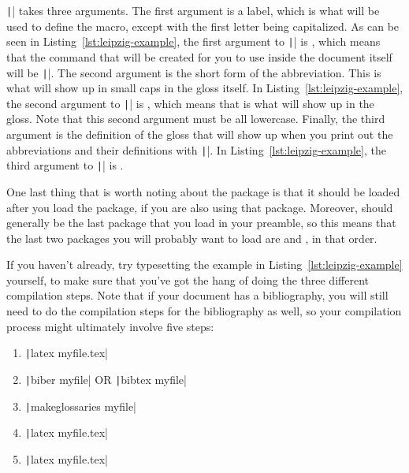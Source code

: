 \texttt|\newleipzig| takes three arguments.
The first argument is a label, which is what will be used to define the macro, except with the first letter being capitalized.
As can be seen in Listing~\ref{lst:leipzig-example}, the first argument to \texttt|\newleipzig| is , which means that the command that will be created for you to use inside the document itself will be \texttt|\Pol{}|.
The second argument is the short form of the abbreviation.
This is what will show up in small caps in the gloss itself.
In Listing~\ref{lst:leipzig-example}, the second argument to \texttt|\newleipzig| is , which means that \Pol{} is what will show up in the gloss.
Note that this second argument must be all lowercase.
Finally, the third argument is the definition of the gloss that will show up when you print out the abbreviations and their definitions with \texttt|\printglosses|.
In Listing~\ref{lst:leipzig-example}, the third argument to \texttt|\newleipzig| is .

One last thing that is worth noting about the  package is that it should be loaded after you load the  package, if you are also using that package.
Moreover,  should generally be the last package that you load in your preamble, so this means that the last two packages you will probably want to load are  and , in that order.

If you haven't already, try typesetting the example in Listing~\ref{lst:leipzig-example} yourself, to make sure that you've got the hang of doing the three different compilation steps.
Note that if your document has a bibliography, you will still need to do the compilation steps for the bibliography as well, so your compilation process might ultimately involve five steps:

\begin{enumerate}[label={(\roman*)}]

	\item{\texttt|latex myfile.tex|}

	\item{\texttt|biber myfile| OR \texttt|bibtex myfile|}

	\item{\texttt|makeglossaries myfile|}

	\item{\texttt|latex myfile.tex|}

	\item{\texttt|latex myfile.tex|}

\end{enumerate}


